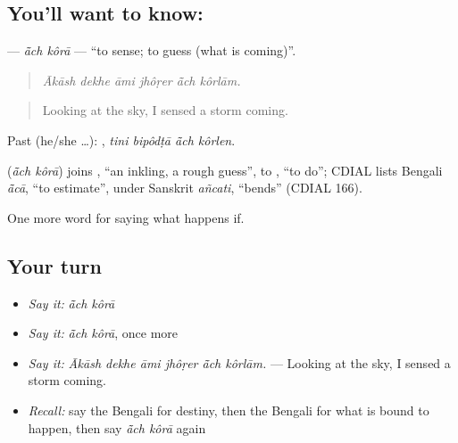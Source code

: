 \subsection*{You'll want to know:  }
\textbf{ } — \emph{ā̃ch kôrā} — \textquotedblleft{}to sense; to guess (what is coming)\textquotedblright{}.

\begin{quote}
     
\end{quote}

\begin{quote}
\emph{Ākāsh dekhe āmi jhôṛer ā̃ch kôrlām.}
\end{quote}

\begin{quote}
Looking at the sky, I sensed a storm coming.
\end{quote}

Past (he/she …):    , \emph{tini bipôdṭā ā̃ch kôrlen}.

\begin{cousinweb}
\textbf{ } (\emph{ā̃ch kôrā}) joins , \textquotedblleft{}an inkling, a rough guess\textquotedblright{}, to , \textquotedblleft{}to do\textquotedblright{}; CDIAL lists Bengali \emph{ā̃cā}, \textquotedblleft{}to estimate\textquotedblright{}, under Sanskrit \emph{añcati}, \textquotedblleft{}bends\textquotedblright{} (CDIAL 166).
\end{cousinweb}

\begin{grammarlens}[title={What you've built}]
One more word for saying what happens if.
\end{grammarlens}

\subsection*{Your turn}
\begin{itemize}
\raggedright
  \item \emph{Say it:} \emph{ā̃ch kôrā}
  \item \emph{Say it:} \emph{ā̃ch kôrā}, once more
  \item \emph{Say it:} \emph{Ākāsh dekhe āmi jhôṛer ā̃ch kôrlām.} — Looking at the sky, I sensed a storm coming.
  \item \emph{Recall:} say the Bengali for destiny, then the Bengali for what is bound to happen, then say \emph{ā̃ch kôrā} again
\end{itemize}

